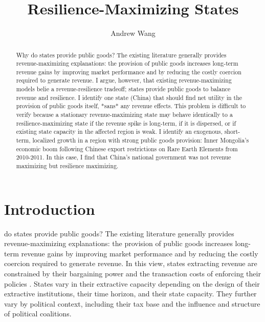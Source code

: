 \documentclass[bibtex,nonblind]{apsr_submission}
\title{Resilience-Maximizing States}
\author{Andrew Wang}
       {University of Washington}
       {}
\begin{document}
\begin{frontmatter}
\begin{abstract}
Why do states provide public goods? The existing literature generally provides revenue-maximizing explanations: the provision of public goods increases long-term revenue gains by improving market performance and by reducing the costly coercion required to generate revenue. I argue, however, that existing revenue-maximizing models belie a revenue-resilience tradeoff; states provide public goods to balance revenue and resilience. I identify one state (China) that should find net utility in the provision of public goods itself, *sans* any revenue effects. This problem is difficult to verify because a stationary revenue-maximizing state may behave identically to a resilience-maximizing state if the revenue spike is long-term, if it is dispersed, or if existing state capacity in the affected region is weak. I identify an exogenous, short-term, localized growth in a region with strong public goods provision: Inner Mongolia's economic boom following Chinese export restrictions on Rare Earth Elements from 2010-2011. In this case, I find that China's national government was not revenue maximizing but resilience maximizing.
\end{abstract}
\end{frontmatter}

\section{Introduction}

 do states provide public goods? The existing literature generally provides revenue-maximizing explanations: the provision of public goods increases long-term revenue gains by improving market performance and by reducing the costly coercion required to generate revenue. In this view, states extracting revenue are constrained by their bargaining power and the transaction costs of enforcing their policies \cite{levi1988}. States vary in their extractive capacity depending on the design of their extractive institutions, their time horizon, and their state capacity. They further vary by political context, including their tax base and the influence and structure of political coalitions.
\end{document}
